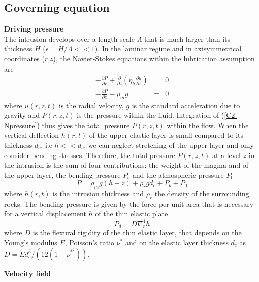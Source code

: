\subsection{Governing equation}
\label{C2-sec:Governing equation}

\textbf{Driving pressure}\\

The  intrusion develops  over a  length scale  $\Lambda$ that  is much
larger than its  thickness $H$ ($\epsilon = H/ \Lambda<<  1$).  In the
laminar  regime  and  in  axisymmetrical  coordinates  ($r$,$z$),  the
Navier-Stokes equations within the lubrication assumption are
\begin{eqnarray}
  -\frac{\partial P}{\partial r}  +  \frac{\partial}{\partial z}\left(\eta_h \frac{\partial u}{\partial z}\right) &=&0\label{C2_V1} \\
  -\frac{\partial P}{\partial z}  - \rho_{m}g&  =&0\label{C2-Npressure}
\end{eqnarray}
where  $u(r,z,t)$  is  the  radial   velocity,  $g$  is  the  standard
acceleration due to gravity and  $P(r,z,t)$ is the pressure within the
fluid.   Integration  of  (\ref{C2-Npressure}) thus  gives  the  total
pressure  $P(r,z,t)$ within  the flow.   When the  vertical deflection
$h(r,t)$ of the upper elastic layer is small compared to its thickness
$d_c$, i.e $h<<d_c$, we can neglect  stretching of the upper layer and
only  consider  bending  stresses.    Therefore,  the  total  pressure
$P(r,z,t)$  at  a level  $z$  in  the intrusion  is  the  sum of  four
contributions: the  weight of the  magma and  of the upper  layer, the
bending pressure $P_b$ and the atmospheric pressure $P_0$
\begin{equation}
  P = \rho_m g (h-z)+\rho_rgd_c+P_b+P_0
  \label{C2-pression}
\end{equation}
where $h(r,t)$ is the intrusion  thickness and $\rho_r$ the density of
the surrounding rocks. The bending pressure  is given by the force per
unit area  that is necessary  for a  vertical displacement $h$  of the
thin elastic plate \citep{Turcotte:1982ca}
\begin{equation}
  P_d = D\nabla_r^4h
\end{equation}
where $D$  is the flexural  rigidity of  the thin elastic  layer, that
depends on the Young's modulus $E$, Poisson's ratio $\nu^*$ and on the
elastic           layer          thickness           $d_c$          as
$D = Ed_c^3/\left(12(1-\nu^*^2)\right)$.

\vspace{.5cm} \textbf{Velocity field} \vspace{.5cm}


